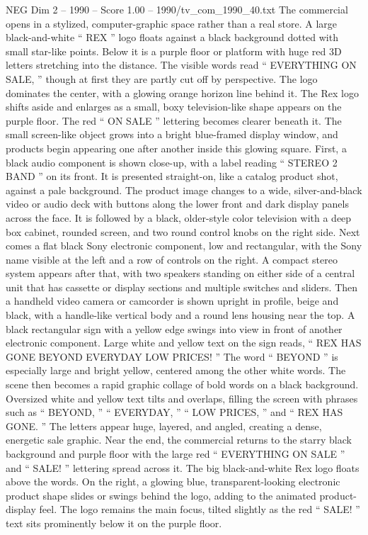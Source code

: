 \begin{textsample}{NEG Dim 2 – 1990 – Score 1.00 – 1990/tv\_com\_1990\_40.txt}  \label{ex:f2_neg_067}
The commercial opens in a stylized, computer-graphic space rather than a real store.
A large black-and-white “ REX ” logo floats against a black background dotted with small star-like points.
Below it is a purple floor or platform with huge red 3D letters stretching into the distance.
The visible words read “ EVERYTHING ON SALE, ” though at first they are partly cut off by perspective.
The logo dominates the center, with a glowing orange horizon line behind it.
The Rex logo shifts aside and enlarges as a small, boxy television-like shape appears on the purple floor.
The red “ ON SALE ” lettering becomes clearer beneath it.
The small screen-like object grows into a bright blue-framed display window, and products begin appearing one after another inside this glowing square.
First, a black audio component is shown close-up, with a label reading “ STEREO 2 BAND ” on its front.
It is presented straight-on, like a catalog product shot, against a pale background.
The product image changes to a wide, silver-and-black video or audio deck with buttons along the lower front and dark display panels across the face.
It is followed by a black, older-style color television with a deep box cabinet, rounded screen, and two round control knobs on the right side.
Next comes a flat black Sony electronic component, low and rectangular, with the Sony name visible at the left and a row of controls on the right.
A compact stereo system appears after that, with two speakers standing on either side of a central unit that has cassette or display sections and multiple switches and sliders.
Then a handheld video camera or camcorder is shown upright in profile, beige and black, with a handle-like vertical body and a round lens housing near the top.
A black rectangular sign with a yellow edge swings into view in front of another electronic component.
Large white and yellow text on the sign reads, “ REX HAS GONE BEYOND EVERYDAY LOW PRICES! ” The word “ BEYOND ” is especially large and bright yellow, centered among the other white words.
The scene then becomes a rapid graphic collage of bold words on a black background.
Oversized white and yellow text tilts and overlaps, filling the screen with phrases such as “ BEYOND, ” “ EVERYDAY, ” “ LOW PRICES, ” and “ REX HAS GONE. ” The letters appear huge, layered, and angled, creating a dense, energetic sale graphic.
Near the end, the commercial returns to the starry black background and purple floor with the large red “ EVERYTHING ON SALE ” and “ SALE! ” lettering spread across it.
The big black-and-white Rex logo floats above the words.
On the right, a glowing blue, transparent-looking electronic product shape slides or swings behind the logo, adding to the animated product-display feel.
The logo remains the main focus, tilted slightly as the red “ SALE! ” text sits prominently below it on the purple floor.

\end{textsample}
